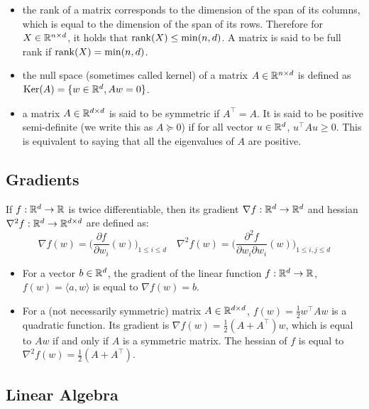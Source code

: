 \begin{itemize}
    \item the rank of a matrix corresponds to the dimension of the span of its columns, which is equal to the dimension of the span of its rows. Therefore for $X \in \mathbb{R}^{n \times d}$, it holds that $\rank(X) \leq \min(n, d)$. A matrix is said to be full rank if $\rank(X) = \min(n, d)$.
    \item the null space (sometimes called kernel) of a matrix $A \in \mathbb{R}^{n \times d}$ is defined as $\mathrm{Ker}(A) = \{ w \in \mathbb{R}^d, A w = 0 \}$.
    \item a matrix $A \in \mathbb{R}^{d \times d}$ is said to be symmetric if $A^{\top} = A$. It is said to be positive semi-definite (we write this as  $A \succeq 0$) if for all vector $u \in \mathbb{R}^d$, $u^\top A u \geq 0$. This is equivalent to saying that all the eigenvalues of $A$ are positive. 
\end{itemize}

\subsection{Gradients}

If $f : \mathbb{R}^d \to \mathbb{R}$ is twice differentiable, then its gradient $\nabla f : \mathbb{R}^d \to \mathbb{R}^d$ and hessian $\nabla^2 f : \mathbb{R}^d \to \mathbb{R}^{d \times d}$ are defined as: 
\[\nabla f(w) = \Big ( \frac{\partial f}{\partial w_i}(w) \Big )_{1 \leq i \leq d} \quad \nabla^2 f(w) = \Big ( \frac{\partial^2 f}{\partial w_i \partial w_i}(w) \Big )_{1 \leq i, j \leq d} \] 

\begin{itemize}
    \item For a vector $b \in \mathbb{R}^d$, the gradient of the linear function $f : \mathbb{R}^d \to \mathbb{R}$, $f(w) = \langle a , w \rangle $ is equal to $\nabla f(w) = b$. 
    \item For a (not necessarily symmetric) matrix $A \in \mathbb{R}^{d \times d}$, $f(w) = \frac{1}{2} w^\top A w$ is a quadratic function. Its gradient is $\nabla f(w) = \frac{1}{2} (A + A^\top) w$, which is equal to $A w$ if and only if $A$ is a symmetric matrix. The hessian of $f$ is equal to $\nabla^2 f(w) = \frac{1}{2} (A + A^\top)$. 
\end{itemize}

\subsection{Linear Algebra}

